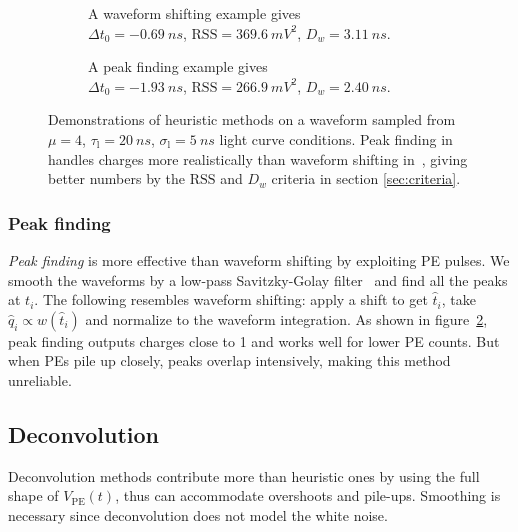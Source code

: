\begin{figure}[H]
  \begin{subfigure}{.5\textwidth}
    \centering
    \resizebox{\textwidth}{!}{}
    \caption{\label{fig:shifting} A waveform shifting example gives \\ $\Delta t_0=\SI{-0.69}{ns}$, $\mathrm{RSS}=\SI{369.6}{mV^2}$, $D_w=\SI{3.11}{ns}$.}
  \end{subfigure}
  \begin{subfigure}{.5\textwidth}
    \centering
    \resizebox{\textwidth}{!}{}
    \caption{\label{fig:peak} A peak finding example gives \\ $\Delta t_0=\SI{-1.93}{ns}$, $\mathrm{RSS}=\SI{266.9}{mV^2}$, $D_w=\SI{2.40}{ns}$.}
  \end{subfigure}
  \caption{\label{fig:method}Demonstrations of heuristic methods on a waveform sampled from $\mu=4$, $\tau_\mathrm{l}=\SI{20}{ns}$, $\sigma_\mathrm{l}=\SI{5}{ns}$ light curve conditions.  Peak finding in~ handles charges more realistically than waveform shifting in~, giving better numbers by the $\mathrm{RSS}$ and $D_w$ criteria in section \ref{sec:criteria}.}
\end{figure}

\subsubsection{Peak finding}
\label{sec:findpeak}

\textit{Peak finding} is more effective than waveform shifting by exploiting PE pulses.  We smooth the waveforms by a low-pass Savitzky-Golay filter~\cite{savitzky_smoothing_1964} and find all the peaks at $t_i$.  The following resembles waveform shifting: apply a shift to get $\hat{t}_i$, take $\hat{q}_i \propto w(\hat{t}_i)$ and normalize to the waveform integration. As shown in figure~\ref{fig:peak}, peak finding outputs charges close to 1 and works well for lower PE counts.  But when PEs pile up closely, peaks overlap intensively, making this method unreliable.

\subsection{Deconvolution}
\label{sec:deconv}
Deconvolution methods contribute more than heuristic ones by using the full shape of $V_\mathrm{PE}(t)$, thus can accommodate overshoots and pile-ups.  Smoothing is necessary since deconvolution does not model the white noise.

